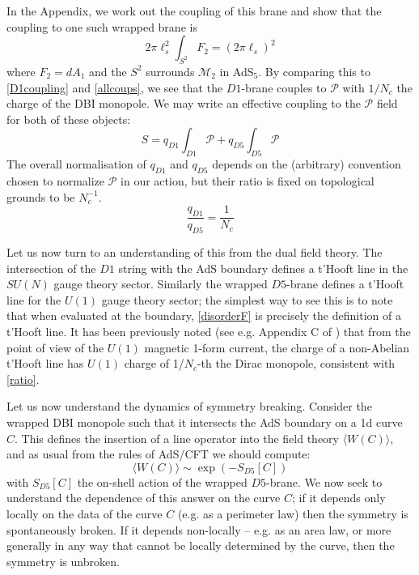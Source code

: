 \documentclass[aps,preprint,nofootinbib,preprintnumbers,eqsecnum,superscriptaddress]{revtex4}
\def\le{\left}
\def\ri{\right}
\newcommand\sM{{\ensuremath{{\mathcal M}}}}
\newcommand\sP{{\mathcal P}}
\begin{document}
In the Appendix, we work out the coupling of this brane and show that the coupling to one such wrapped brane is
\begin{equation}
2\pi \ell_s^2 \int_{S^2} F_2 = (2\pi \ell_s)^2 \label{disorderF} 
\end{equation}
where $F_2 = dA_1$ and the $S^2$ surrounds $\sM_2$ in AdS$_5$. By comparing this to \eqref{D1coupling} and \eqref{allcoups}, we see that the $D1$-brane couples to $\sP$ with $1/N_{c}$ the charge of the DBI monopole. We may write an effective coupling to the $\sP$ field for both of these objects:
\begin{equation}
S = q_{D1} \int_{D1} \sP + q_{D5} \int_{D5} \sP
\end{equation}
The overall normalisation of $q_{D1}$ and $q_{D5}$ depends on the (arbitrary) convention chosen to normalize $\sP$ in our action, but their ratio is fixed on topological grounds to be $N_{c}^{-1}$.
\begin{equation}
\frac{q_{D1}}{q_{D5}} = \frac{1}{N_c} \label{ratio}
\end{equation}

Let us now turn to an understanding of this from the dual field theory. The intersection of the $D1$ string with the AdS boundary defines a t'Hooft line in the $SU(N)$ gauge theory sector. Similarly the wrapped $D5$-brane defines a t'Hooft line for the $U(1)$ gauge theory sector; the simplest way to see this is to note that when evaluated at the boundary, \eqref{disorderF} is precisely the definition of a t'Hooft line. It has been previously noted (see e.g. Appendix C of \cite{Hofman:2017vwr}) that from the point of view of the $U(1)$ magnetic 1-form current, the charge of a non-Abelian t'Hooft line has $U(1)$ charge of 1/$N_{c}$-th the Dirac monopole, consistent with \eqref{ratio}. 

Let us now understand the dynamics of symmetry breaking. Consider the wrapped DBI monopole such that it intersects the AdS boundary on a 1d curve $C$. This defines the insertion of a line operator into the field theory $\langle W(C) \rangle$, and as usual from the rules of AdS/CFT we should compute:
\begin{equation}
\langle W(C) \rangle \sim \exp\le(-S_{D5}[C]\ri)
\end{equation} 
with $S_{D5}[C]$ the on-shell action of the wrapped $D5$-brane. We now seek to understand the dependence of this answer on the curve $C$; if it depends only locally on the data of the curve $C$ (e.g. as a perimeter law) then the symmetry is spontaneously broken. If it depends non-locally -- e.g. as an area law, or more generally in any way that cannot be locally determined by the curve, then the symmetry is unbroken.
\end{document}
